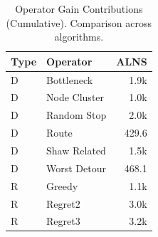 \begin{table}[t]
\centering
\caption{Operator Gain Contributions (Cumulative). Comparison across algorithms.}
\label{tab:operators_comparison}
\begin{tabular}{l l r }
\toprule
\textbf{Type} & \textbf{Operator} & \textbf{ALNS} \\
\midrule
D & Bottleneck & 1.9k \\
D & Node Cluster & 1.0k \\
D & Random Stop & 2.0k \\
D & Route & 429.6 \\
D & Shaw Related & 1.5k \\
D & Worst Detour & 468.1 \\
\addlinespace
R & Greedy & 1.1k \\
R & Regret2 & 3.0k \\
R & Regret3 & 3.2k \\
\bottomrule
\end{tabular}
\end{table}